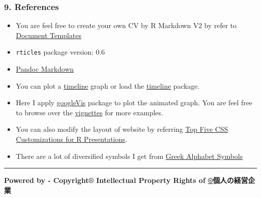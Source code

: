 \documentclass[]{article}
\providecommand{\tightlist}{%
  \setlength{\itemsep}{0pt}\setlength{\parskip}{0pt}}
\begin{document}
\subsubsection{9. References}\label{references}

\begin{itemize}
\tightlist
\item
  You are feel free to create your own CV by R Markdown V2 by refer to
  \href{http://rmarkdown.rstudio.com/developer_document_templates.html?version=0.99.484\&mode=server}{Document
  Templates}
\item
  \texttt{rticles} package version: 0.6
\item
  \href{http://rmarkdown.rstudio.com/authoring_pandoc_markdown.html}{Pandoc
  Markdown}
\item
  You can plot a
  \href{http://stackoverflow.com/questions/20695311/chronological-timeline-with-points-in-time-and-format-date}{timeline}
  graph or load the \href{http://jason.bryer.org/timeline/}{timeline}
  package.
\item
  Here I apply
  \href{https://cran.r-project.org/web/packages/googleVis/vignettes/Using_googleVis_with_knitr.html}{googleVis}
  package to plot the animated graph. You are feel free to browse over
  the
  \href{https://cran.r-project.org/web/packages/googleVis/vignettes/googleVis.pdf}{vignettes}
  for more examples.
\item
  You can also modify the layout of website by referring
  \href{http://rstudio-pubs-static.s3.amazonaws.com/27777_55697c3a476640caa0ad2099fe914ae5.html\#/}{Top
  Five CSS Customizations for R Presentations}.
\item
  There are a lot of diversified symbols I get from
  \href{http://www.rapidtables.com/math/symbols/greek_alphabet.htm}{Greek
  Alphabet Symbols}
\end{itemize}

\begin{center}\rule{0.5\linewidth}{\linethickness}\end{center}

{\textbf{Powered by - Copyright® Intellectual Property Rights of
\href{http://www.scibrokes.com}{®}個人の経営企業}}
\end{document}
